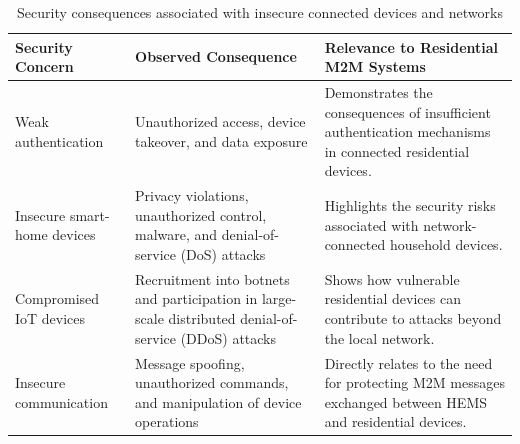 \begin{table}[htbp]
  \centering
  \caption{Security consequences associated with insecure connected devices and networks}
  \label{tab:security_consequences_intro}
  \renewcommand{\arraystretch}{1.2}
  \begin{tabular}{p{3.2cm} p{5.2cm} p{5.2cm}}
    \hline
    \textbf{Security Concern}                                                                              & \textbf{Observed Consequence} & \textbf{Relevance to Residential M2M Systems} \\
    \hline

    Weak authentication                                                                                    &
    Unauthorized access, device takeover, and data exposure                                                &
    Demonstrates the consequences of insufficient authentication mechanisms in connected residential devices.                                                                              \\

    Insecure smart-home devices                                                                            &
    Privacy violations, unauthorized control, malware, and denial-of-service (DoS) attacks                 &
    Highlights the security risks associated with network-connected household devices.                                                                                                     \\

    Compromised IoT devices                                                                                &
    Recruitment into botnets and participation in large-scale distributed denial-of-service (DDoS) attacks &
    Shows how vulnerable residential devices can contribute to attacks beyond the local network.                                                                                           \\

    Insecure communication                                                                                 &
    Message spoofing, unauthorized commands, and manipulation of device operations                         &
    Directly relates to the need for protecting M2M messages exchanged between HEMS and residential devices.                                                                               \\


\end{tabular}
\end{table}
